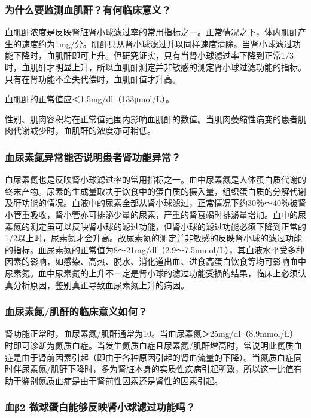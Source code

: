 \subsubsection{为什么要监测血肌酐？有何临床意义？}

血肌酐浓度是反映肾脏肾小球滤过率的常用指标之一。正常情况之下，体内肌酐产生的速度约为1mg/分。肌酐只从肾小球滤过并以同样速度清除。当肾小球滤过功能下降时，血肌酐即可上升。但研究证实，只有当肾小球滤过率下降到正常1/3时，血肌酐才明显上升，所以血肌酐测定并非敏感的测定肾小球过滤功能的指标。只有在肾功能不全失代偿时，血肌酐值才升高。

血肌酐的正常值应＜1.5mg/dl（133μmol/L）。

性别、肌肉容积均在正常值范围内影响血肌酐的数值。当肌肉萎缩性病变的患者肌肉代谢减少时，血肌酐的浓度亦可稍低。

\subsubsection{血尿素氮异常能否说明患者肾功能异常？}

血尿素氮也是反映肾小球滤过率的常用指标之一。血中尿素氮是人体蛋白质代谢的终末产物。尿素的生成量取决于饮食中的蛋白质的摄入量，组织蛋白质的分解代谢及肝功能的情况。血液中的尿素全部从肾小球滤过，正常情况下约30％～40％被肾小管重吸收，肾小管亦可排泌少量的尿素，严重的肾衰竭时排泌量增加。血中的尿素氮的测定虽可以反映肾小球的滤过功能，但肾小球的滤过功能必须下降到正常的1/2以上时，尿素氮才会升高。故尿素氮的测定并非敏感的反映肾小球的滤过功能的指标。血尿素氮的正常值为8～21mg/dl（2.9～7.5mmol/L），其血液水平受多种因素的影响，如感染、高热、脱水、消化道出血、进食高蛋白饮食等均可影响血中尿素氮。血中尿素氮的上升不一定是肾小球的滤过功能受损的结果，临床上必须认真分析原因，鉴别真正导致血尿素氮上升的病因。

\subsubsection{血尿素氮/肌酐的临床意义如何？}

肾功能正常时，血尿素氮/肌酐通常为10。当血尿素氮＞25mg/dl（8.9mmol/L）时即可诊断为氮质血症。当发生氮质血症且尿素氮/肌酐增高时，常说明此氮质血症是由于肾前因素引起（即由于各种原因引起的肾血流量的下降）。当氮质血症同时伴尿素氮/肌酐下降时，多为肾脏本身的实质性疾病引起所致，所以这一比值有助于鉴别氮质血症是由于肾前性因素还是肾性的因素引起。

\subsubsection{血β2 微球蛋白能够反映肾小球滤过功能吗？}


